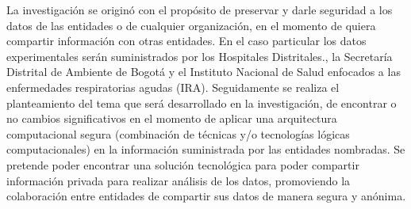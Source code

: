 \documentclass[a4paper,openright,12pt]{book}
\theoremstyle{definition}
\theoremstyle{remark}
\begin{document}
La investigación se originó con el propósito de preservar y darle seguridad a los datos de las entidades o de cualquier organización, en el momento de quiera compartir información con otras entidades. En el caso particular los datos experimentales serán suministrados por los Hospitales Distritales., la Secretaría Distrital de Ambiente de Bogotá y el Instituto Nacional de Salud enfocados a las enfermedades respiratorias agudas (IRA). Seguidamente se realiza el planteamiento del tema que será desarrollado en la investigación, de encontrar o no cambios significativos en el momento de aplicar una arquitectura computacional segura (combinación de técnicas y/o tecnologías lógicas computacionales) en la información suministrada por las entidades nombradas. Se pretende poder encontrar una solución tecnológica para poder compartir información privada para realizar análisis de los datos, promoviendo la colaboración entre entidades de compartir sus datos de manera segura y anónima.\\\\
\end{document}
